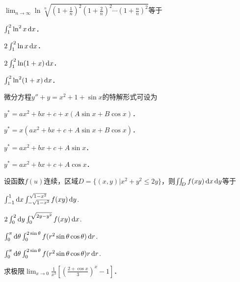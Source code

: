 \documentclass[plain,noanswer,medmath]{../../template/jnuexam}
\begin{document}
\begin{problem}
$\lim_{n \to \infty} \ln \sqrt[n]{\left(1 + \frac{1}{n} \right)^2\left(1 + \frac{2}{n} \right)^2
 \cdots \left(1 + \frac{n}{n} \right)^2}$等于\pickout{}
\begin{abcd}
\item $\int_1^2 \ln^2 x\mathop{}\!\mathrm{d} x$．
\item $2\int_1^2 \ln x\mathop{}\!\mathrm{d} x$．
\item $2\int_1^2 \ln(1 + x)\mathop{}\!\mathrm{d} x$．
\item $\int_1^2 \ln^2(1 + x)\mathop{}\!\mathrm{d} x$．
\end{abcd}
\end{problem}




\begin{problem}
微分方程$y'' + y = x^2 + 1 + \sin x$的特解形式可设为\pickout{}
\begin{abcd}
\item $y^* = ax^2 + bx + c + x(A\sin x + B\cos x)$．
\item $y^* = x(ax^2 + bx + c + A\sin x + B\cos x)$．
\item $y^* = ax^2 + bx + c + A\sin x$．
\item $y^* = ax^2 + bx + c + A\cos x$．
\end{abcd}
\end{problem}


\begin{problem}
设函数$f(u)$连续，区域$D = \{(x,y)|x^2 + y^2 \le 2y\}$，则$\iint_D f(xy)\mathop{}\!\mathrm{d} x\mathop{}\!\mathrm{d} y$等于\pickout{}
\begin{abcd}
\item $\int_{-1}^1 \mathop{}\!\mathrm{d} x \int_{- \sqrt{1 - x^2}}^{\sqrt{1 - x^2}} f(xy)\mathop{}\!\mathrm{d} y$.
\item $2\int_0^2 \mathop{}\!\mathrm{d} y \int_0^{\sqrt{2y - y^2}} f(xy)\mathop{}\!\mathrm{d} x$.
\item $\int_0^{\pi}\d\theta \int_0^{2\sin \theta} f(r^2\sin \theta \cos \theta)\dr$.
\item $\int_0^{\pi}\d\theta \int_0^{2\sin \theta} f(r^2\sin \theta \cos \theta)r\dr$.
\end{abcd}
\end{problem}








\begin{problem}[points=10]
求极限$\lim_{x \to 0} \frac{1}{x^3}\left[\left(\frac{2 + \cos x}{3} \right)^x - 1 \right]$．
\end{problem}
\end{document}
